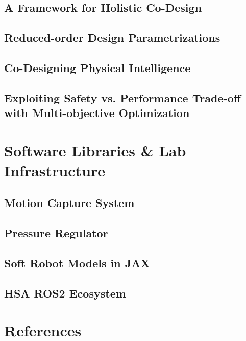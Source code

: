 \documentclass{dissertation}
\begin{document}
\section{A Framework for Holistic Co-Design}
\section{Reduced-order Design Parametrizations}
\section{Co-Designing Physical Intelligence}
\section{Exploiting Safety vs. Performance Trade-off with Multi-objective Optimization}

\chapter{Software Libraries \& Lab Infrastructure}
\section{Motion Capture System}
\section{Pressure Regulator}
\section{Soft Robot Models in JAX}
\section{HSA ROS2 Ecosystem}


\thumbfalse

\chapter*{References}






\printabbreviations[title={Abbreviations}]

% 


\end{document}
